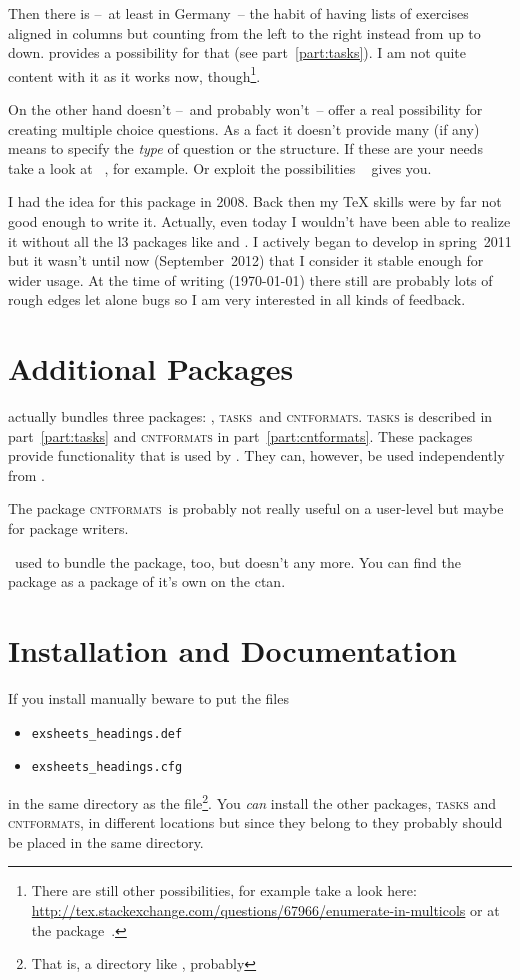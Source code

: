 \documentclass[DIV10,toc=index,toc=bib,numbers=noendperiod]{cnpkgdoc}
\newcommand*\cntformats{{\scshape\textcolor{main}{cntformats}}\xspace}
\newcommand*\Tasks{{\scshape\textcolor{main}{tasks}}\xspace}
\begin{document}
Then there is --~at least in Germany~-- the habit of having lists of exercises
aligned in columns but counting from the left to the right instead from up to
down.  \ExSheets provides a possibility for that (see part~\ref{part:tasks}).
I am not quite content with it as it works now, though\footnote{There are
  still other possibilities, for example take a look here:
  \url{http://tex.stackexchange.com/questions/67966/enumerate-in-multicols} or
  at the  package~\cite{multienum}.}.

On the other hand \ExSheets doesn't --~and probably won't~-- offer a real
possibility for creating multiple choice questions.  As a fact it doesn't
provide many (if any) means to specify the \emph{type} of question or the
structure.  If these are your needs take a look at
~\cite{examdesign}, for example.  Or exploit the
possibilities ~\cite{enumitem} gives you.

I had the idea for this package in 2008.  Back then my \TeX{} skills were by
far not good enough to write it.  Actually, even today I wouldn't have been
able to realize it without all the l3 packages like  and
.  I actively began to develop \ExSheets in spring~2011 but
it wasn't until now (September~2012) that I consider it stable enough for
wider usage.  At the time of writing (\today) there still are probably lots of
rough edges let alone bugs so I am very interested in all kinds of feedback.

\section{Additional Packages}
\ExSheets actually bundles three packages: \ExSheets, \Tasks\ and \cntformats.
\Tasks is described in part~\ref{part:tasks} and \cntformats in
part~\ref{part:cntformats}.  These packages provide functionality that is used
by \ExSheets.  They can, however, be used independently from \ExSheets.

The package \cntformats\ is probably not really useful on a user-level but
maybe for package writers.

\ExSheets\ used to bundle the 
package, too, but doesn't any more.  You can find the 
package as a package of it's own on the \ac{ctan}.

\section{Installation and Documentation}
If you install \ExSheets manually beware to put the files
\begin{itemize}
  \item[]\verb+exsheets_headings.def+
  \item[]\verb+exsheets_headings.cfg+
\end{itemize}
in the same directory as the  file\footnote{That is, a
  directory like , probably}.  You
\emph{can} install the other packages, \Tasks and \cntformats, in different
locations but since they belong to \ExSheets they probably should be placed in
the same directory.
\end{document}
